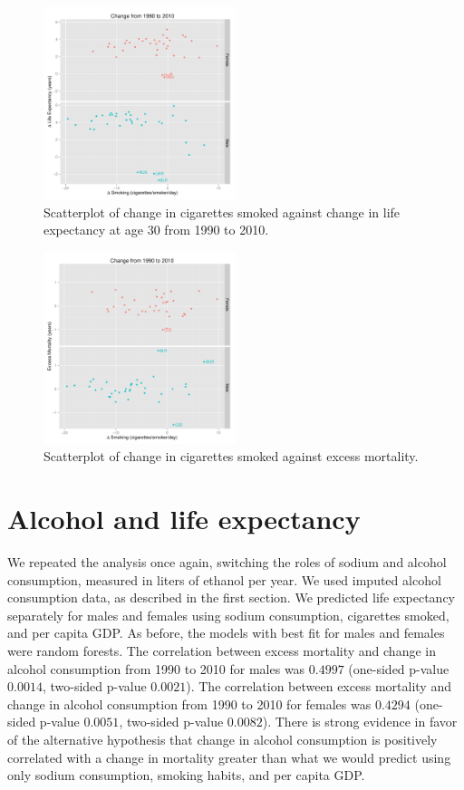 \documentclass{article}
\begin{document}
\begin{figure}[h]
\centering
\includegraphics[width = 0.5\textwidth]{smoking_lifeexp.pdf}
\caption{Scatterplot of change in cigarettes smoked against change in life expectancy at age 30 from 1990 to 2010.}\label{fig:smoking_lifeexp}
\end{figure}

\begin{figure}[h]
\centering
\includegraphics[width = 0.5\textwidth]{smoking_exmort.pdf}
\caption{Scatterplot of change in cigarettes smoked against excess mortality.}\label{fig:smoking_excessmortality}
\end{figure}


\clearpage
\section{Alcohol and life expectancy}
We repeated the analysis once again, switching the roles of sodium and alcohol consumption, measured in liters of ethanol per year.  We used imputed alcohol consumption data, as described in the first section. We predicted life expectancy separately for males and females using sodium consumption, cigarettes smoked, and per capita GDP.  As before, the models with best fit for males and females were random forests.  The correlation between excess mortality and change in alcohol consumption from 1990 to 2010 for males was $0.4997$ (one-sided p-value $0.0014$, two-sided p-value $0.0021$).  The correlation between excess mortality and change in alcohol consumption from 1990 to 2010 for females was $0.4294$ (one-sided p-value $0.0051$, two-sided p-value $0.0082$).  There is strong evidence in favor of the alternative hypothesis that change in alcohol consumption is positively correlated with a change in mortality greater than what we would predict using only sodium consumption, smoking habits, and per capita GDP.
\end{document}
